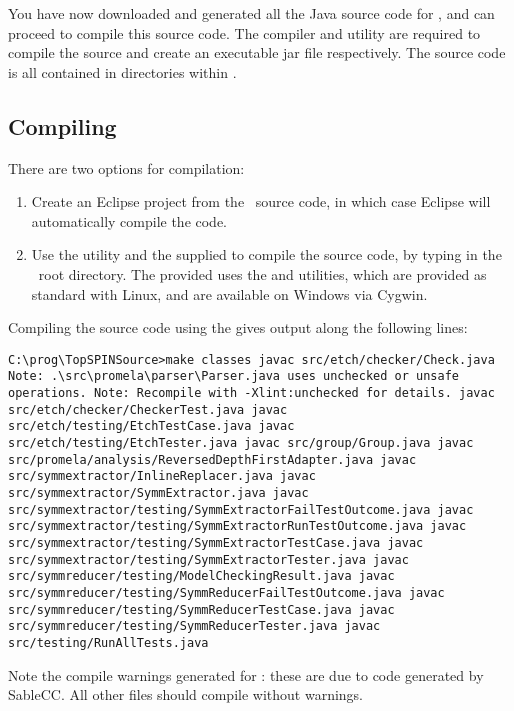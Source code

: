 You have now downloaded and generated all the Java source code for
\topspin, and can proceed to compile this source code.  The
 compiler and  utility are required to
compile the source and create an executable jar file respectively.
The source code is all contained in directories within .

\subsection{Compiling}

There are two options for compilation:

\begin{enumerate}

\item Create an Eclipse project from the \topspin\ source code, in which case
Eclipse will automatically compile the code.

\item Use the  utility and the supplied  to compile
the source code, by typing  in the \topspin\
root directory. The provided  uses the 
and \inline{find} utilities, which are provided as standard with
Linux, and are available on Windows via Cygwin.

\end{enumerate}
%
Compiling the source code using the  gives output
along the following lines:
%
\begin{lstlisting}
C:\prog\TopSPINSource>make classes javac src/etch/checker/Check.java
Note: .\src\promela\parser\Parser.java uses unchecked or unsafe
operations. Note: Recompile with -Xlint:unchecked for details. javac
src/etch/checker/CheckerTest.java javac
src/etch/testing/EtchTestCase.java javac
src/etch/testing/EtchTester.java javac src/group/Group.java javac
src/promela/analysis/ReversedDepthFirstAdapter.java javac
src/symmextractor/InlineReplacer.java javac
src/symmextractor/SymmExtractor.java javac
src/symmextractor/testing/SymmExtractorFailTestOutcome.java javac
src/symmextractor/testing/SymmExtractorRunTestOutcome.java javac
src/symmextractor/testing/SymmExtractorTestCase.java javac
src/symmextractor/testing/SymmExtractorTester.java javac
src/symmreducer/testing/ModelCheckingResult.java javac
src/symmreducer/testing/SymmReducerFailTestOutcome.java javac
src/symmreducer/testing/SymmReducerTestCase.java javac
src/symmreducer/testing/SymmReducerTester.java javac
src/testing/RunAllTests.java
\end{lstlisting}
%
Note the compile warnings generated for : these
are due to code generated by SableCC.  All other files should
compile without warnings.
%
